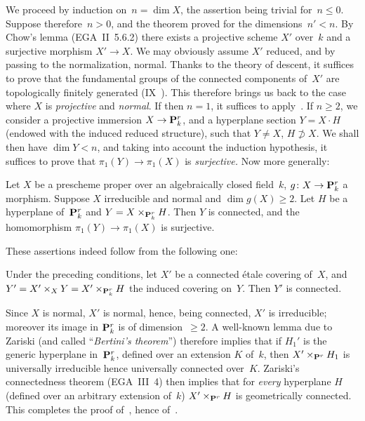 We
proceed by induction on~$n=\dim X$, the assertion
being trivial for~$n\le 0$. Suppose therefore~$n>0$, and the
theorem proved for the
dimensions~$n'<n$. By Chow's lemma (EGA~II~5.6.2) there
exists a projective scheme $X'$ over~$k$ and a surjective morphism
$X'\to X$. We may obviously assume $X'$ reduced, and by
passing to the normalization, normal. Thanks to the theory of
descent, it suffices to prove that the fundamental groups of the
connected components of~$X'$ are topologically finitely
generated (IX~). This therefore brings us back
to the case where $X$ is \emph{projective} and \emph{normal}. If
then $n=1$, it suffices to apply~. If $n\ge 2$, we
consider a projective immersion $X\to \PP_k^r$, and a hyperplane
section $Y=X\cdot H$
(endowed
with the induced reduced structure), such that
$Y\ne X$,
\ie $H\not\supset X$. We shall then have $\dim Y<n$, and taking into account
the induction hypothesis, it suffices to prove that
$\pi_1(Y)\to \pi_1(X)$ is \emph{surjective.} Now more
generally:

\begin{lemma}
\label{X.2.10}
Let $X$ be a prescheme proper over an algebraically closed
field~$k$, $g\colon X\to \PP_k^r$ a morphism. Suppose $X$
irreducible and normal and $\dim g(X)\ge 2$. Let $H$ be a
hyperplane of~$\mathbf{P}_k^r$ and $Y=X\times_{\mathbf{P}_k^r} H$. Then $Y$ is
connected, and the homomorphism $\pi_1(Y)\to\pi_1(X)$ is surjective.
\end{lemma}

These assertions indeed follow from the following one:

\begin{corollary}
\label{X.2.11}
Under the preceding conditions, let $X'$ be a connected \'etale
covering of~$X$, and $Y'=X'\times_X Y=X'\times_{\mathbf{P}_k^r} H$ the
induced covering on~$Y$. Then $Y'$ is connected.
\end{corollary}

Since $X$ is normal, $X'$ is normal, hence, being connected, $X'$
is irreducible; moreover its image in $\mathbf{P}_k^r$ is of
dimension~$\ge 2$. A well-known lemma due to Zariski (and
called ``\emph{Bertini's theorem}'') therefore implies that
if $H_1'$ is the generic hyperplane in~$\mathbf{P}_k^r$,
defined over an extension $K$ of~$k$, then $X'\times_{\mathbf{P}^r} H_1$
is universally irreducible hence universally connected
over~$K$. Zariski's connectedness theorem (EGA~III~4)
then implies that for \emph{every} hyperplane $H$ (defined over an
arbitrary extension of~$k$) $X'\times_{\mathbf{P}^r} H$ is
geometrically connected. This completes the proof
of~, hence of~.

